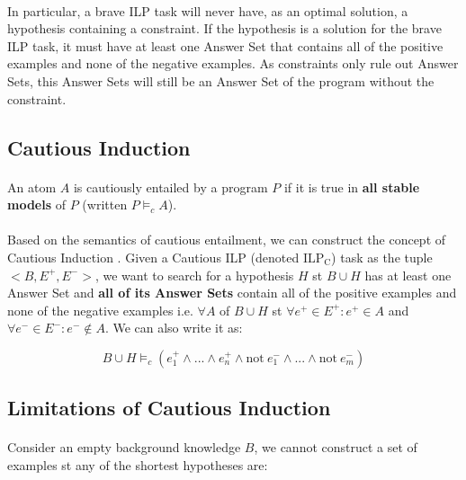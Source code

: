 \documentclass{article}
\theoremstyle{plain}
\theoremstyle{definition}
\begin{document}
\begin{multicols}{2}
\paragraph{} In particular, a brave ILP task will never have, as an optimal solution, a hypothesis containing a constraint. If the hypothesis is a solution for the brave ILP task, it must have at least one Answer Set that contains all of the positive examples and none of the negative examples. As constraints only rule out Answer Sets, this Answer Sets will still be an Answer Set of the program without the constraint.

\subsection{Cautious Induction}
\paragraph{} An atom $A$ is cautiously entailed by a program $P$ if it is true in \textbf{all stable models} of $P$ (written $P \models_c A$).

\paragraph{} Based on the semantics of cautious entailment, we can construct the concept of Cautious Induction  \cite{sakama08}. Given a Cautious ILP (denoted $\text{ILP}_\text{C}$) task as the tuple $<B, E^+, E^->$, we want to search for a hypothesis $H$ st $B \cup H$ has at least one Answer Set and \textbf{all of its Answer Sets} contain all of the positive examples and none of the negative examples i.e. $\forall A$ of $B \cup H$ st $\forall e^+ \in E^+: e^+ \in A$ and $\forall e^- \in E^-: e^- \not\in A$. We can also write it as:

$$B \cup H \models_c (e_1^+ \land ... \land e_n^+ \land \text{not}\ e_1^- \land ...  \land \text{not}\ e_m^-)$$

\subsection{Limitations of Cautious Induction}

\paragraph{} Consider an empty background knowledge $B$, we cannot construct a set of examples st any of the shortest hypotheses are:


\end{multicols}
\end{document}

